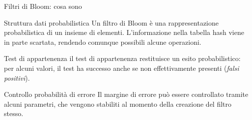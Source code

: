 \documentclass{beamer}
\begin{document}
	\begin{frame}{Filtri di Bloom: cosa sono}
	  	\begin{block}{Struttura dati probabilistica}
			Un filtro di Bloom è una rappresentazione probabilistica di un insieme di elementi.
			L'informazione nella tabella hash viene in parte scartata, rendendo comunque possibili alcune operazioni.
	  	\end{block}

	  	\begin{block}{Test di appartenenza}
	  		il test di appartenenza restituisce un esito probabilistico: per alcuni valori, il test ha successo anche se non effettivamente presenti
	  		(\emph{falsi positivi}).
	  	\end{block}

	  	\begin{block}{Controllo probabilità di errore}
			Il margine di errore può essere
			controllato tramite alcuni parametri, che vengono stabiliti al momento della creazione del filtro
			stesso.
			\end{block}
	\end{frame}
\end{document}
